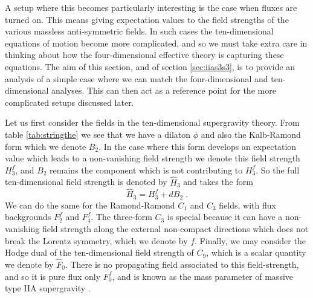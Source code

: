 \documentclass[11pt,a4paper]{article}
\numberwithin{equation}{section}
\numberwithin{table}{section}\setlength{\multlinegap}{25pt}
\newcommand{\be}{\begin{equation}}
\newcommand{\ee}{\end{equation}}
\begin{document}
A setup where this becomes particularly interesting is the case when fluxes are turned on. This means giving expectation values to the field strengths of the various massless anti-symmetric fields. In such cases the ten-dimensional equations of motion become more complicated, and so we must take extra care in thinking about how the four-dimensional effective theory is capturing these equations. The aim of this section, and of section \ref{sec:iias3s3}, is to provide an analysis of a simple case where we can match the four-dimensional and ten-dimensional analyses. This can then act as a reference point for the more complicated setups discussed later. 

Let us first consider the fields in the ten-dimensional supergravity theory. From table \ref{tab:stringthe} we see that we have a dilaton $\phi$ and also the Kalb-Ramond form which we denote $B_2$. In the case where this form develops an expectation value which leads to a non-vanishing field strength we denote this field strength $H^f_3$, and $B_2$ remains the component which is not contributing to $H^f_3$. So the full ten-dimensional field strength is denoted by $\hat{H}_3$ and takes the form
\be
\hat{H}_3 = H_3^f + d B_2 \;.
\ee
We can do the same for the Ramond-Ramond $C_1$ and $C_3$ fields, with flux backgrounds $F_2^f$ and $F^f_4$. The three-form $C_3$ is special because it can have a non-vanishing field strength along the external non-compact directions which does not break the Lorentz symmetry, which we denote by $f$. Finally, we may consider the Hodge dual of the ten-dimensional field strength of $C_9$, which is a scalar quantity we denote by $\hat{F}_0$. There is no propagating field associated to this field-strength, and so it is pure flux only $F_0^f$, and is known as the mass parameter of massive type IIA supergravity \cite{Romans:1985tz}.  
\end{document}
